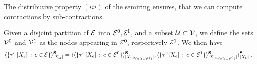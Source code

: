 The distributive property $(iii)$ of the semiring ensures, that we can compute contractions by sub-contractions.

\begin{theorem}
    Given a disjoint partition of $\mathcal{E}$ into $\mathcal{E}^{0},\mathcal{E}^{1}$, and a subset $\mathcal{U}\subset\mathcal{V}$, we define the sets $\mathcal{V}^{0}$ and $\mathcal{V}^{1}$ as the nodes appearing in $\mathcal{E}^{0}$, respectively $\mathcal{E}^{1}$.
    We then have
    \begin{align*}
        \langle
            \left\{\tau^{e}\left[X_{e}\right]\,:\,e\in\mathcal{E}\right\}
        \rangle^{\mathbf{S}}_{[X_{\mathcal{U}}]}
        =
        \langle
            \langle
                \{\tau^{e}\left[X_{e}\right] \,:\, e\in\mathcal{E}^{0}\}
            \rangle^{\mathbf{S}}_{[X_{\mathcal{V}^{0}\cap(\mathcal{U}\cup\mathcal{V}^{1})}]},
            \langle
                \{\tau^{e}\left[X_{e}\right] \,:\, e\in\mathcal{E}^{1}\}
            \rangle^{\mathbf{S}}_{[X_{\mathcal{V}^{1}\cap(\mathcal{U}\cup\mathcal{V}^{0})}]}
        \rangle^{\mathbf{S}}_{[X_{\mathcal{U}}]} \, .
    \end{align*}
\end{theorem}
